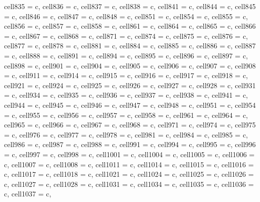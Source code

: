 {\begin{longtblr}[
  label = none,
  entry = none,
]
{  cell{83}{5} = {c},
  cell{83}{6} = {c},
  cell{83}{7} = {c},
  cell{83}{8} = {c},
  cell{84}{1} = {c},
  cell{84}{4} = {c},
  cell{84}{5} = {c},
  cell{84}{6} = {c},
  cell{84}{7} = {c},
  cell{84}{8} = {c},
  cell{85}{1} = {c},
  cell{85}{4} = {c},
  cell{85}{5} = {c},
  cell{85}{6} = {c},
  cell{85}{7} = {c},
  cell{85}{8} = {c},
  cell{86}{1} = {c},
  cell{86}{4} = {c},
  cell{86}{5} = {c},
  cell{86}{6} = {c},
  cell{86}{7} = {c},
  cell{86}{8} = {c},
  cell{87}{1} = {c},
  cell{87}{4} = {c},
  cell{87}{5} = {c},
  cell{87}{6} = {c},
  cell{87}{7} = {c},
  cell{87}{8} = {c},
  cell{88}{1} = {c},
  cell{88}{4} = {c},
  cell{88}{5} = {c},
  cell{88}{6} = {c},
  cell{88}{7} = {c},
  cell{88}{8} = {c},
  cell{89}{1} = {c},
  cell{89}{4} = {c},
  cell{89}{5} = {c},
  cell{89}{6} = {c},
  cell{89}{7} = {c},
  cell{89}{8} = {c},
  cell{90}{1} = {c},
  cell{90}{4} = {c},
  cell{90}{5} = {c},
  cell{90}{6} = {c},
  cell{90}{7} = {c},
  cell{90}{8} = {c},
  cell{91}{1} = {c},
  cell{91}{4} = {c},
  cell{91}{5} = {c},
  cell{91}{6} = {c},
  cell{91}{7} = {c},
  cell{91}{8} = {c},
  cell{92}{1} = {c},
  cell{92}{4} = {c},
  cell{92}{5} = {c},
  cell{92}{6} = {c},
  cell{92}{7} = {c},
  cell{92}{8} = {c},
  cell{93}{1} = {c},
  cell{93}{4} = {c},
  cell{93}{5} = {c},
  cell{93}{6} = {c},
  cell{93}{7} = {c},
  cell{93}{8} = {c},
  cell{94}{1} = {c},
  cell{94}{4} = {c},
  cell{94}{5} = {c},
  cell{94}{6} = {c},
  cell{94}{7} = {c},
  cell{94}{8} = {c},
  cell{95}{1} = {c},
  cell{95}{4} = {c},
  cell{95}{5} = {c},
  cell{95}{6} = {c},
  cell{95}{7} = {c},
  cell{95}{8} = {c},
  cell{96}{1} = {c},
  cell{96}{4} = {c},
  cell{96}{5} = {c},
  cell{96}{6} = {c},
  cell{96}{7} = {c},
  cell{96}{8} = {c},
  cell{97}{1} = {c},
  cell{97}{4} = {c},
  cell{97}{5} = {c},
  cell{97}{6} = {c},
  cell{97}{7} = {c},
  cell{97}{8} = {c},
  cell{98}{1} = {c},
  cell{98}{4} = {c},
  cell{98}{5} = {c},
  cell{98}{6} = {c},
  cell{98}{7} = {c},
  cell{98}{8} = {c},
  cell{99}{1} = {c},
  cell{99}{4} = {c},
  cell{99}{5} = {c},
  cell{99}{6} = {c},
  cell{99}{7} = {c},
  cell{99}{8} = {c},
  cell{100}{1} = {c},
  cell{100}{4} = {c},
  cell{100}{5} = {c},
  cell{100}{6} = {c},
  cell{100}{7} = {c},
  cell{100}{8} = {c},
  cell{101}{1} = {c},
  cell{101}{4} = {c},
  cell{101}{5} = {c},
  cell{101}{6} = {c},
  cell{101}{7} = {c},
  cell{101}{8} = {c},
  cell{102}{1} = {c},
  cell{102}{4} = {c},
  cell{102}{5} = {c},
  cell{102}{6} = {c},
  cell{102}{7} = {c},
  cell{102}{8} = {c},
  cell{103}{1} = {c},
  cell{103}{4} = {c},
  cell{103}{5} = {c},
  cell{103}{6} = {c},
  cell{103}{7} = {c},
}
\end{longtblr}}

